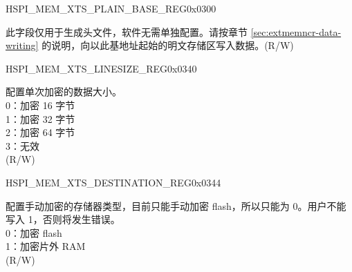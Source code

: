 
\begin{register}{H}{SPI\_MEM\_XTS\_PLAIN\_BASE\_REG}{0x0300}\label{regdesc:SPIMEMXTSPLAINBASEREG}
%
\regnewline%
\begin{regdesc}\begin{reglist}
\label{fielddesc:SPIMEMXTSPLAIN}\item [SPI\_MEM\_XTS\_PLAIN] 此字段仅用于生成头文件，软件无需单独配置。请按章节 \ref{sec:extmemncr-data-writing} 的说明，向以此基地址起始的明文存储区写入数据。(R/W)
\end{reglist}\end{regdesc}
\end{register}


\begin{register}{H}{SPI\_MEM\_XTS\_LINESIZE\_REG}{0x0340}\label{regdesc:SPIMEMXTSLINESIZEREG}
%
%
\regnewline%
\begin{regdesc}\begin{reglist}
\label{fielddesc:SPIMEMXTSLINESIZE}\item [SPI\_MEM\_XTS\_LINESIZE] 配置单次加密的数据大小。\\
0：加密 16 字节\\
1：加密 32 字节\\
2：加密 64 字节\\
3：无效\\
(R/W)
\end{reglist}\end{regdesc}
\end{register}


\begin{register}{H}{SPI\_MEM\_XTS\_DESTINATION\_REG}{0x0344}\label{regdesc:SPIMEMXTSDESTINATIONREG}
%
%
\regnewline%
\begin{regdesc}\begin{reglist}
\label{fielddesc:SPIMEMXTSDESTINATION}\item [SPI\_MEM\_XTS\_DESTINATION] 配置手动加密的存储器类型，目前只能手动加密 flash，所以只能为 0。用户不能写入 1，否则将发生错误。\\
0：加密 flash\\
1：加密片外 RAM\\
(R/W)
\end{reglist}\end{regdesc}
\end{register}


